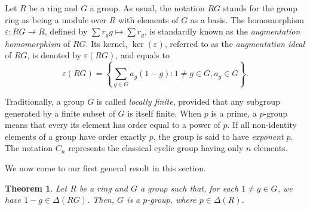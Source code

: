 \documentclass[12pt]{amsart}
\newtheorem{theorem}{Theorem}[section]
\theoremstyle{definition}
\begin{document}
Let $R$ be a ring and $G$ a group. As usual, the notation $RG$ stands for the group ring as being a module over $R$ with elements of $G$ as a basis. The homomorphism $\varepsilon \colon RG \to R$, defined by $\sum r_g g \mapsto \sum r_g$, is standardly known as the \textit{augmentation homomorphism} of $RG$. Its kernel, $\ker(\varepsilon)$, referred to as the \textit{augmentation ideal} of $RG$, is denoted by $\varepsilon(RG)$, and equals to $$\varepsilon(RG)=\left\{ \sum_{g \in G}a_g(1 - g) \colon 1 \neq g \in G, a_g \in G \right\}.$$

Traditionally, a group $G$ is called \textit{locally finite}, provided that any subgroup generated by a finite subset of $G$ is itself finite. When $p$ is a prime, a $p$-group means that every its element has order equal to a power of $p$. If all non-identity elements of a group have order exactly $p$, the group is said to have \textit{exponent} $p$. The notation $C_n$ represents the classical cyclic group having only $n$ elements.

\medskip

We now come to our first general result in this section.

\begin{theorem}\label{p in Delta and p-group}
Let $R$ be a ring and $G$ a group such that, for each $1 \neq g \in G$, we have $1-g \in \Delta(RG)$. Then, $G$ is a $p$-group, where $p \in \Delta(R)$.
\end{theorem}
\end{document}
